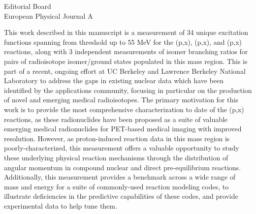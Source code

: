 \documentclass{letter} %
\begin{document}
\begin{letter}{
Editorial Board \\
European Physical Journal A}

 
\noindent This work described in this manuscript is a measurement of 34 unique excitation functions spanning  from threshold up to 55 MeV for the (p,x), (p,x), and (p,x) reactions, along with 3 independent measurements of isomer branching ratios for pairs of radioisotope isomer/ground states populated in this mass region. This is part of a recent, ongoing effort at UC Berkeley and Lawrence Berkeley National Laboratory to address the gaps in existing nuclear data which have been identified by the applications community, focusing in particular on the production of novel and emerging medical radioisotopes. The primary motivation for this work is to provide the most comprehensive characterization to date of the (p,x) reactions, as these radionuclides have been proposed as a suite of valuable emerging medical radionuclides for PET-based medical imaging with improved resolution.  However, as proton-induced reaction data in this mass region is poorly-characterized, this measurement offers a valuable opportunity to study these underlying physical reaction mechanisms through the distribution of angular momentum in compound nuclear and direct pre-equilibrium reactions. Additionally, this measurement provides a benchmark across a wide range of mass and energy for a suite of commonly-used reaction modeling codes, to illustrate deficiencies in the predictive capabilities of these codes, and provide experimental data to help tune them. 




\end{letter}
\end{document}
